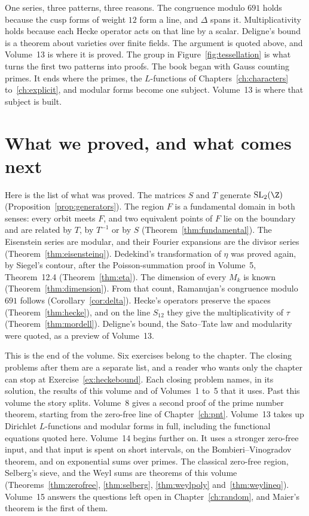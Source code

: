 \begin{beauty}
One series, three patterns, three reasons. The congruence modulo $691$ holds because the cusp forms of weight $12$ form a line, and $\Delta$ spans it. Multiplicativity holds because each Hecke operator acts on that line by a scalar. Deligne's bound is a theorem about varieties over finite fields. The argument is quoted above, and Volume~13 is where it is proved. The group in Figure~\ref{fig:tessellation} is what turns the first two patterns into proofs. The book began with Gauss counting primes. It ends where the primes, the $L$-functions of Chapters~\ref{ch:characters} to~\ref{ch:explicit}, and modular forms become one subject. Volume~13 is where that subject is built.
\end{beauty}

\section{What we proved, and what comes next}

Here is the list of what was proved. The matrices $S$ and $T$ generate $\mathrm{SL}_2(\Z)$ (Proposition~\ref{prop:generators}). The region $F$ is a fundamental domain in both senses: every orbit meets $F$, and two equivalent points of $F$ lie on the boundary and are related by $T$, by $T^{-1}$ or by $S$ (Theorem~\ref{thm:fundamental}). The Eisenstein series are modular, and their Fourier expansions are the divisor series (Theorem~\ref{thm:eisensteinq}). Dedekind's transformation of $\eta$ was proved again, by Siegel's contour, after the Poisson-summation proof in Volume~5, Theorem~12.4 (Theorem~\ref{thm:eta}). The dimension of every $M_k$ is known (Theorem~\ref{thm:dimension}). From that count, Ramanujan's congruence modulo $691$ follows (Corollary~\ref{cor:delta}). Hecke's operators preserve the spaces (Theorem~\ref{thm:hecke}), and on the line $S_{12}$ they give the multiplicativity of $\tau$ (Theorem~\ref{thm:mordell}). Deligne's bound, the Sato--Tate law and modularity were quoted, as a preview of Volume~13.

This is the end of the volume. Six exercises belong to the chapter. The closing problems after them are a separate list, and a reader who wants only the chapter can stop at Exercise~\ref{ex:heckebound}. Each closing problem names, in its solution, the results of this volume and of Volumes~1 to~5 that it uses. Past this volume the story splits. Volume~8 gives a second proof of the prime number theorem, starting from the zero-free line of Chapter~\ref{ch:pnt}. Volume~13 takes up Dirichlet $L$-functions and modular forms in full, including the functional equations quoted here. Volume~14 begins further on. It uses a stronger zero-free input, and that input is spent on short intervals, on the Bombieri--Vinogradov theorem, and on exponential sums over primes. The classical zero-free region, Selberg's sieve, and the Weyl sums are theorems of this volume (Theorems~\ref{thm:zerofree}, \ref{thm:selberg}, \ref{thm:weylpoly} and~\ref{thm:weylineq}). Volume~15 answers the questions left open in Chapter~\ref{ch:random}, and Maier's theorem is the first of them.

